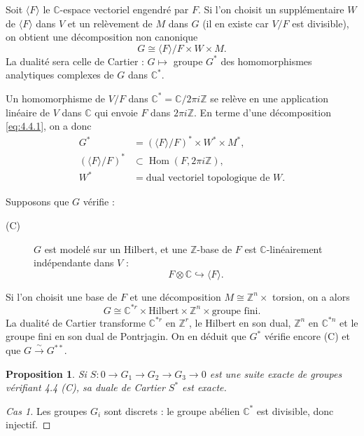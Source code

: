 \documentclass[12pt,a4paper]{article}
\theoremstyle{plain}
\newtheorem{proposition}[theorem]{Proposition}
\theoremstyle{definition}
\theoremstyle{remark}
\DeclareMathOperator{\Hom}{Hom}
\newcommand{\Z}{\mathbb{Z}}
\newcommand{\C}{\mathbb{C}}
\providecommand{\Hom}{\operatorname{Hom}}
\begin{document}
Soit $\langle F \rangle$ le $\C$-espace vectoriel engendré par $F$. Si l'on choisit un supplémentaire $W$
de $\langle F \rangle$ dans $V$ et un relèvement de $M$ dans $G$ (il en existe car $V/F$ est divisible), on
obtient une décomposition non canonique
\begin{equation}\label{eq:4.4.1}
G \cong \langle F \rangle / F \times W \times M.
\end{equation}
La dualité sera celle de Cartier : $G \mapsto {}$ groupe $G^*$ des homomorphismes analytiques
complexes de $G$ dans $\C^*$.

Un homomorphisme de $V/F$ dans $\C^* = \C/2\pi i\Z$ se relève en une application linéaire
de $V$ dans $\C$ qui envoie $F$ dans $2\pi i\Z$. En terme d'une décomposition \eqref{eq:4.4.1}, on a donc
\begin{align*}
G^* &= (\langle F \rangle / F)^* \times W^* \times M^*, \\
(\langle F \rangle / F)^* &\subset \Hom(F, 2\pi i\Z), \\
W^* &= \text{dual vectoriel topologique de } W.
\end{align*}

Supposons que $G$ vérifie :
\begin{description}
\item[(C)] $G$ est modelé sur un Hilbert, et une $\Z$-base de $F$ est $\C$-linéairement indépendante dans $V$ :
\[
F \otimes \C \hookrightarrow \langle F \rangle.
\]
\end{description}
Si l'on choisit une base de $F$ et une décomposition $M \cong \Z^n \times {}$ torsion, on a alors
\begin{equation}\label{eq:4.4.2}
G \cong \C^{*r} \times \text{Hilbert} \times \Z^n \times \text{groupe fini}.
\end{equation}
La dualité de Cartier transforme $\C^{*r}$ en $\Z^r$, le Hilbert en son dual, $\Z^n$ en $\C^{*n}$ et le
groupe fini en son dual de Pontrjagin. On en déduit que $G^*$ vérifie encore (C) et que
$G \xrightarrow{\sim} G^{**}$.

\begin{proposition}
Si $S : 0 \to G_1 \to G_2 \to G_3 \to 0$ est une suite exacte de groupes
vérifiant \emph{4.4 (C)}, sa duale de Cartier $S^*$ est exacte.
\end{proposition}

\begin{proof}[Cas 1]
Les groupes $G_i$ sont discrets : le groupe abélien $\C^*$ est divisible, donc injectif.
\end{proof}
\end{document}
